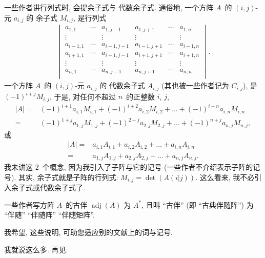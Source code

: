 \documentclass[../libro.tex]{subfiles}
\begin{document}
一些作者讲行列式时, 会提余子式与%
代数余子式.
通俗地, 一个方阵 \(A\)~的 \((i, j)\)-元
\(a_{i,j}\) 的%
余子式 \(M_{i,j}\),
是行列式
\begin{align*}
    \begin{vmatrix}
        a_{1,1}     & \cdots & a_{1,j-1}   &
        a_{1,j+1}   & \cdots & a_{1,n}       \\
        \vdots      & {}     & \vdots      &
        \vdots      & {}     & \vdots        \\
        a_{i-1,1}   & \cdots & a_{i-1,j-1} &
        a_{i-1,j+1} & \cdots & a_{i-1,n}     \\
        a_{i+1,1}   & \cdots & a_{i+1,j-1} &
        a_{i+1,j+1} & \cdots & a_{i+1,n}     \\
        \vdots      & {}     & \vdots      &
        \vdots      & {}     & \vdots        \\
        a_{n,1}     & \cdots & a_{n,j-1}   &
        a_{n,j+1}   & \cdots & a_{n,n}       \\
    \end{vmatrix}.
\end{align*}
一个方阵 \(A\)~的 \((i, j)\)-元
\(a_{i,j}\) 的%
代数余子式 \(A_{i,j}\)
(其也被一些作者记为 \(C_{i,j}\)),
是
\((-1)^{i+j} M_{i,j}\).
于是,
对任何不超过 \(n\)~的正整数 \(i\), \(j\),
\begin{align*}
    |A|
    = {} &
    (-1)^{i+1} a_{i,1} M_{i,1}
    + (-1)^{i+2} a_{i,2} M_{i,2}
    + \dots
    + (-1)^{i+n} a_{i,n} M_{i,n}
    \\
    = {} &
    (-1)^{1+j} a_{1,j} M_{1,j}
    + (-1)^{2+j} a_{2,j} M_{2,j}
    + \dots
    + (-1)^{n+j} a_{n,j} M_{n,j},
\end{align*}
或
\begin{align*}
    |A|
    = {} &
    a_{i,1} A_{i,1}
    + a_{i,2} A_{i,2}
    + \dots
    + a_{i,n} A_{i,n}
    \\
    = {} &
    a_{1,j} A_{1,j}
    + a_{2,j} A_{2,j}
    + \dots
    + a_{n,j} A_{n,j}.
\end{align*}
我未讲这 \(2\)~个概念,
因为我引入了子阵与它的记号
(一些作者不介绍表示子阵的记号).
其实,
余子式就是子阵的行列式:
\(M_{i,j} = \det {(A(i|j))}\).
这么看来, 我不必引入余子式或代数余子式了.

一些作者写方阵 \(A\)~的古伴
\(\operatorname{adj} {(A)}\)
为 \(A^*\),
且叫 ``古伴'' (即 ``古典伴随阵'')
为 ``伴随'' ``伴随阵'' ``伴随矩阵''.

我希望, 这些说明,
可助您适应别的文献上的词与记号.


我就说这么多.
再见.
\end{document}
